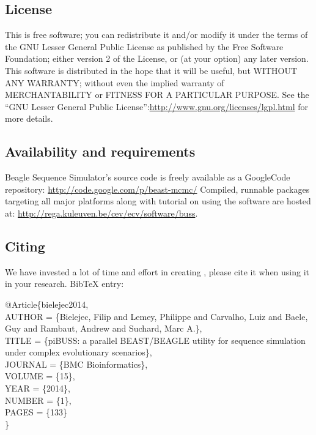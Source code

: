 \subsection{License}
This is free software; you can redistribute it and/or modify it under the terms of the {GNU} Lesser General Public License as published by the Free Software Foundation; either version 2 of the License, or (at your option) any later version. This software is distributed in the hope that it will be useful, but {WITHOUT ANY WARRANTY}; without even the implied warranty of {MERCHANTABILITY} or {FITNESS FOR A PARTICULAR PURPOSE}. See the ``GNU Lesser General Public License'':\url{http://www.gnu.org/licenses/lgpl.html} for more details.

\subsection{Availability and requirements}
Beagle Sequence Simulator's source code is freely available as a GoogleCode repository:
\url{http://code.google.com/p/beast-mcmc/}
Compiled, runnable packages targeting all major platforms along with tutorial on using the software are hosted at:
\url{http://rega.kuleuven.be/cev/ecv/software/buss}.

\subsection{Citing {\bussname}}
We have invested a lot of time and effort in creating {\bussname}, please cite it when using it in your research. BibTeX entry:

\begin{code}
@Article\{bielejec2014, \\
AUTHOR = \{Bielejec, Filip and Lemey, Philippe and Carvalho, Luiz
and Baele, Guy and Rambaut, Andrew and Suchard, Marc A.\}, \\
TITLE = \{piBUSS: a parallel BEAST/BEAGLE utility for sequence simulation
under complex evolutionary scenarios\}, \\
JOURNAL = \{BMC Bioinformatics\}, \\
VOLUME = \{15\}, \\
YEAR = \{2014\}, \\
NUMBER = \{1\}, \\
PAGES = \{133\} \\
\}
\end{code}
